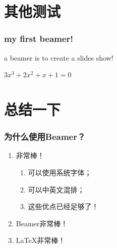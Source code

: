 \documentclass[presentation]{beamer}
\begin{document}
\section{其他测试}

\begin{frame}
\frametitle{my first beamer!}
\begin{definition}
a \alert{beamer} is to create a slides show!
\end{definition}
\begin{example}
$3x^{3}+2x^{2}+x+1=0$
\end{example}
\end{frame}

\section{总结一下}
\begin{frame}
    \frametitle{为什么使用Beamer？}
    \begin{enumerate}
      \item \XeLaTeX 非常棒！
      \begin{enumerate}
        \item 可以使用系统字体；
        \item 可以中英文混排；
        \item 这些优点已经足够了！
      \end{enumerate}
      \item Beamer非常棒！
      \item \LaTeX 非常棒！
    \end{enumerate}
\end{frame}
\end{document}
